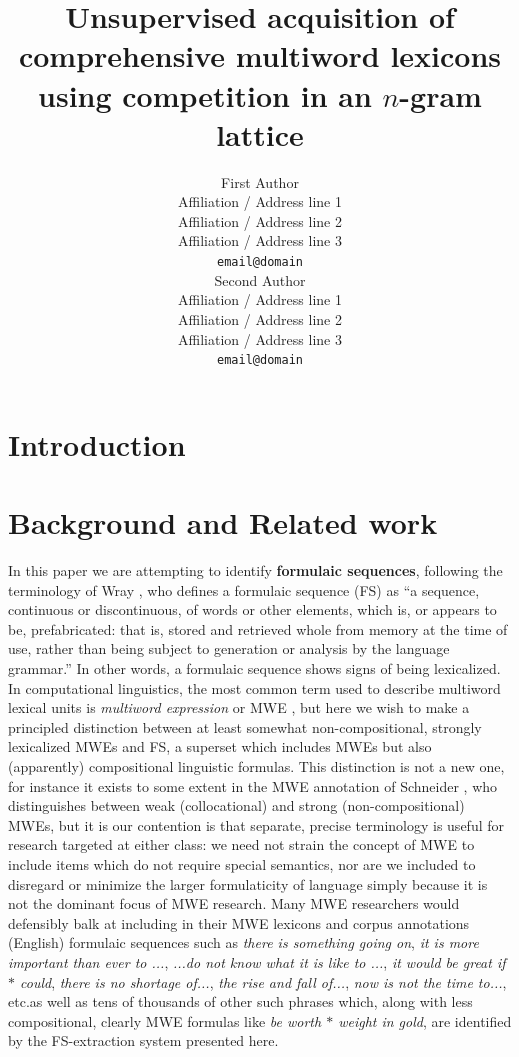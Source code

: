 \documentclass[11pt]{article}
\title{Unsupervised acquisition of comprehensive multiword lexicons \\ using competition in an $n$-gram lattice}
\author{First Author \\
  Affiliation / Address line 1 \\
  Affiliation / Address line 2 \\
  Affiliation / Address line 3 \\
  {\tt email@domain} \\\And
  Second Author \\
  Affiliation / Address line 1 \\
  Affiliation / Address line 2 \\
  Affiliation / Address line 3 \\
  {\tt email@domain} \\}
\date{}
\makeatletter
\def \etc {etc.\@ }
\newcommand{\dotts}{...}
\newcommand{\gap}{$*$\xspace}
\newcommand{\ex}[1]{\textit{#1}\xspace}
\newcommand{\termdef}[1]{\textbf{#1}\xspace}
\makeatother
\begin{document}
\maketitle
\begin{abstract}

\end{abstract}

\section{Introduction}

\section{Background and Related work}

In this paper we are attempting to identify \termdef{formulaic sequences}, following the terminology of Wray , who defines a formulaic sequence (FS) as ``a sequence, continuous or discontinuous, of words or other elements, which is, or appears to be, prefabricated: that is, stored and retrieved whole from memory at the time of use, rather than being subject to generation or analysis by the language grammar.'' In other words, a formulaic sequence shows signs of being lexicalized. In computational linguistics, the most common term used to describe multiword lexical units is \emph{multiword expression} or MWE \cite{Baldwin10}, but here we wish to make a principled distinction between at least somewhat non-compositional, strongly lexicalized MWEs and FS, a superset which includes MWEs but also (apparently) compositional linguistic formulas. This distinction is not a new one, for instance it exists to some extent in the MWE annotation of Schneider \cite{Schneider14a}, who distinguishes between weak (collocational) and strong (non-compositional) MWEs, but it is our contention is that separate, precise terminology is useful for research targeted at either class: we need not strain the concept of MWE to include items which do not require special semantics, nor are we included to disregard or minimize the larger formulaticity of language simply because it is not the dominant focus of MWE research. Many MWE researchers would defensibly balk at including in their MWE lexicons and corpus annotations (English) formulaic sequences such as \ex{there is something going on}, \ex{it is more important than ever to \dotts}, \ex{\dotts do not know what it is like to \dotts}, \ex{it would be great if \gap could}, \ex{there is no shortage of\dotts}, \ex{the rise and fall of\dotts}, \ex{now is not the time to\dotts}, \etc as well as tens of thousands of other such phrases which, along with less compositional, clearly MWE formulas like \ex{be worth \gap weight in gold}, are identified by the FS-extraction system presented here.
\end{document}

